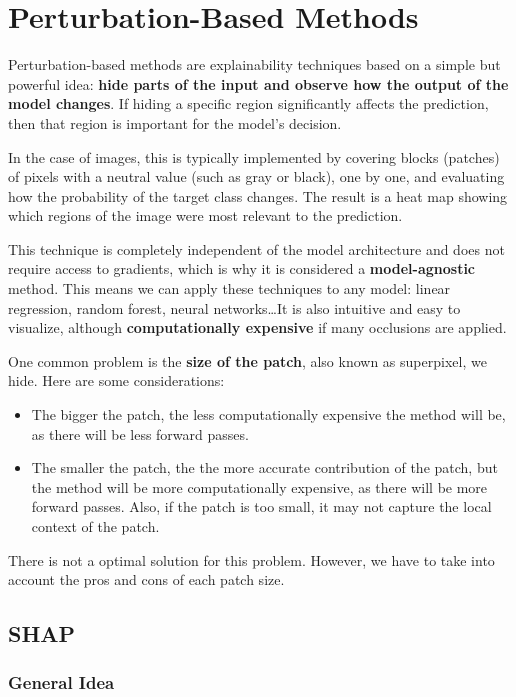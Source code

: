 \section{Perturbation-Based Methods}

Perturbation-based methods are explainability techniques based on a simple but powerful idea: \textbf{hide parts of the input and observe how the output of the model changes}. If hiding a specific region significantly affects the prediction, then that region is important for the model's decision.

In the case of images, this is typically implemented by covering blocks (patches) of pixels with a neutral value (such as gray or black), one by one, and evaluating how the probability of the target class changes. The result is a heat map showing which regions of the image were most relevant to the prediction.

This technique is completely independent of the model architecture and does not require access to gradients, which is why it is considered a \textbf{model-agnostic} method. This means we can apply these techniques to any model: linear regression, random forest, neural networks\ldots It is also intuitive and easy to visualize, although \textbf{computationally expensive} if many occlusions are applied.

One common problem is the \textbf{size of the patch}, also known as superpixel, we hide. Here are some considerations:
\begin{itemize}
\item The bigger the patch, the less computationally expensive the method will be, as there will be less forward passes.
\item The smaller the patch, the the more accurate contribution of the patch, but the method will be more computationally expensive, as there will be more forward passes. Also, if the patch is too small, it may not capture the local context of the patch.
\end{itemize}
There is not a optimal solution for this problem. However, we have to take into account the pros and cons of each patch size.

\subsection{SHAP}

\subsubsection{General Idea}

